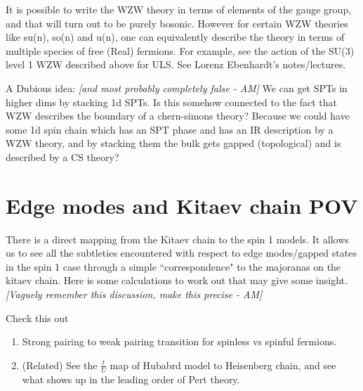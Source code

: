 \documentclass{article}
\newcommand\AM[1]{{\it \color{darkblue}  [#1 - AM]}}
\begin{document}
It is possible to write the WZW theory in terms of elements of the gauge group, and that will turn out to be purely bosonic. However for certain WZW theories like su(n), so(n) and u(n), one can equivalently describe the theory in terms of multiple species of free (Real) fermions. For example, see the action of the SU(3) level 1 WZW described above for ULS. See Lorenz Ebenhardt's notes/lectures.

A Dubious idea:\AM{and most probably completely false}
We can get SPTs in higher dims by stacking 1d SPTs. Is this somehow connected to the fact that WZW describes the boundary of a chern-simons theory? Because we could have some 1d spin chain which has an SPT phase and has an IR description by a WZW theory, and by stacking them the bulk gets gapped (topological) and is described by a CS theory?
\section{Edge modes and Kitaev chain POV}
There is a direct mapping from the Kitaev chain to the spin 1 models. It allows us to see all the subtleties encountered with respect to edge modes/gapped states in the spin 1 case through a simple ``correspondence" to the majoranas on the kitaev chain. Here is some calculations to work out that may give some insight.\AM{Vaguely remember this discussion, make this precise}

Check this out \cite{verresen2017one}
\begin{enumerate}
    \item Strong pairing to weak pairing transition for spinless vs spinful fermions.
    \item (Related) See the $\frac{t}{U}$ map of Hubabrd model to Heisenberg chain, and see what shows up in the leading order of Pert theory.
\end{enumerate}
\end{document}
